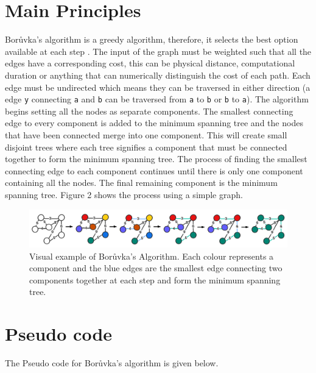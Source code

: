 \documentclass[a4paper,11pt]{article}
\begin{document}
\section{Main Principles}

Borůvka's algorithm is a greedy algorithm, therefore, it selects the best option available at each step \cite{rachmawati2020comparative}. The input of the graph must be weighted such that all the edges have a corresponding cost, this can be physical distance, computational duration or anything that can numerically distinguish the cost of each path. Each edge must be undirected which means they can be traversed in either direction (a edge \verb|y| connecting \verb|a| and \verb|b| can be traversed from \verb|a| to \verb|b| or \verb|b| to \verb|a|). The algorithm begins setting all the nodes as separate components. The smallest connecting edge to every component is added to the minimum spanning tree and the nodes that have been connected merge into one component. This will create small disjoint trees where each tree signifies a component that must be connected together to form the minimum spanning tree. The process of finding the smallest connecting edge to each component continues until there is only one component containing all the nodes. The final remaining component is the minimum spanning tree. Figure 2 shows the process using a simple graph.
\begin{figure}[!h]
    \centering
    \includegraphics[width = \textwidth]{Gantt chart - Page 2 (3).png}
    \vspace{-3mm}
    \caption{Visual example of Borůvka's Algorithm. Each colour represents a component and the blue edges are the smallest edge connecting two components together at each step and form the minimum spanning tree.}
    \label{fig:my_label}
     \vspace{-3mm}
\end{figure}


\section{Pseudo code}
The Pseudo code for Borůvka's algorithm is given below. 
\end{document}
